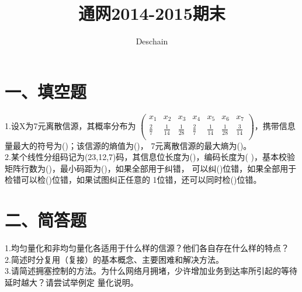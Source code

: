 \documentclass[UTF8]{ctexart}
\title{通网2014-2015期末}
\author{Deschain}
\begin{document}
\maketitle
\section*{一、填空题}
1.设X为7元离散信源，其概率分布为
$\begin{pmatrix}
    x_1         & x_2          & x_3          & x_4         & x_5          & x_6          & x_7 \\
    \frac{2}{7} & \frac{1}{14} & \frac{1}{28} & \frac{2}{7} & \frac{1}{14} & \frac{1}{28} &
    \frac{3}{14}                                                                                \\
  \end{pmatrix}$，携带信息量最大的符号为(\quad\quad\quad)；该信源的熵值为(\quad\quad\quad)，
7元离散信源的最大熵为(\quad\quad\quad)。\\
2.某个线性分组码记为(23,12,7)码，其信息位长度为(\quad\quad\quad)，编码长度为(\quad\quad
\quad)，基本校验矩阵行数为(\quad\quad\quad)，最小码距为(\quad\quad\quad)，如果全部用于纠错，
可以纠(\quad\quad\quad)位错，如果全部用于检错可以检(\quad\quad\quad)位错，如果试图纠正任意的
1位错，还可以同时检(\quad\quad\quad)位错。\\
\section*{二、简答题}
1.均匀量化和非均匀量化各适用于什么样的信源？他们各自存在什么样的特点？\\
2.简述时分复用（复接）的基本概念、主要困难和解决方法。\\
3.请简述拥塞控制的方法。为什么网络月拥堵，少许增加业务到达率所引起的等待延时越大？请尝试举例定
量化说明。\\
\end{document}
